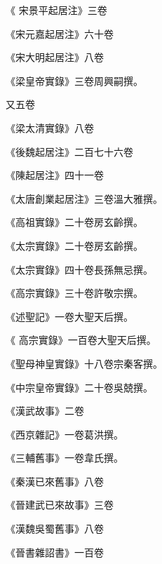 \begin{pinyinscope}
 《
 宋景平起居注》三卷



 《宋元嘉起居注》六十卷



 《宋大明起居注》八卷



 《梁皇帝實錄》三卷周興嗣撰。



 又五卷



 《梁太清實錄》八卷



 《後魏起居注》二百七十六卷



 《陳起居注》四十一卷



 《太唐創業起居注》三卷溫大雅撰。



 《高祖實錄》二十卷房玄齡撰。



 《太宗實錄》二十卷房玄齡撰。



 《太宗實錄》四十卷長孫無忌撰。



 《高宗實錄》三十卷許敬宗撰。



 《述聖記》一卷大聖天后撰。



 《
 高宗實錄》一百卷大聖天后撰。



 《聖母神皇實錄》十八卷宗秦客撰。



 《中宗皇帝實錄》二十卷吳兢撰。



 《漢武故事》二卷



 《西京雜記》一卷葛洪撰。



 《三輔舊事》一卷韋氏撰。



 《秦漢已來舊事》八卷



 《晉建武已來故事》三卷



 《漢魏吳蜀舊事》八卷



 《晉書雜詔書》一百卷




\end{pinyinscope}
